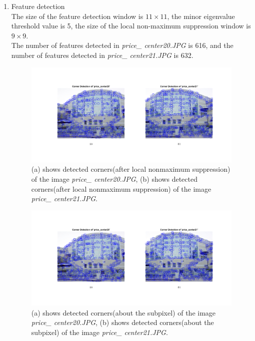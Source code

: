 \documentclass{../../assignment}
\begin{document}
\begin{problemlist}
\begin{enumerate}
\item Feature detection\\
The size of the feature detection window is $11\times11$, 
the minor eigenvalue threshold value is 5, 
the size of the local non-maximum suppression window is $9\times9$.\\
The number of features detected in \emph{price\_ center20.JPG} is 616, and the number of features detected in \emph{price\_ center21.JPG} is 632.

\begin{figure}[H]
  \includegraphics[width=6in]{CornerDetection_NMS}
\caption{(a) shows detected corners(after local nonmaximum suppression) of the image \emph{price\_ center20.JPG}, (b) shows detected corners(after local nonmaximum suppression) of the image \emph{price\_ center21.JPG}.}
\end{figure}
 
\begin{figure}[H]
  \includegraphics[width=6in]{CornerDetection_Subp}
\caption{(a) shows detected corners(about the subpixel) of the image \emph{price\_ center20.JPG}, (b) shows detected corners(about the subpixel) of the image \emph{price\_ center21.JPG}.}
\end{figure} 





\end{enumerate}
\end{problemlist}
\end{document}

